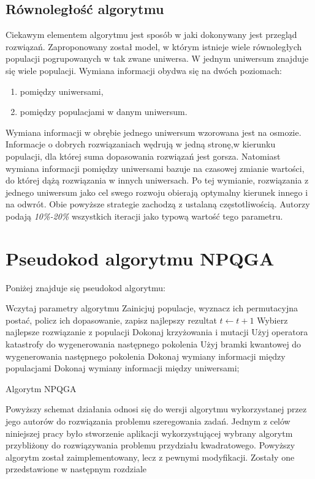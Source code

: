 \subsection{Równoległość algorytmu}
Ciekawym elementem algorytmu jest sposób w jaki dokonywany jest przegląd rozwiązań. Zaproponowany został model, w którym istnieje wiele równoległych populacji pogrupowanych w tak zwane uniwersa. W jednym uniwersum znajduje się wiele populacji. Wymiana informacji obydwa się na dwóch poziomach:
\begin{enumerate}
\item pomiędzy uniwersami,
\item pomiędzy populacjami w danym uniwersum.
\end{enumerate}

Wymiana informacji w obrębie jednego uniwersum wzorowana jest na osmozie. Informacje o dobrych rozwiązaniach wędrują w jedną stronę,w kierunku populacji, dla której suma dopasowania rozwiązań jest gorsza. Natomiast wymiana informacji pomiędzy uniwersami bazuje na czasowej zmianie wartości, do której dążą rozwiązania w innych uniwersach. Po tej wymianie, rozwiązania z jednego uniwersum jako cel swego rozwoju obierają optymalny kierunek innego i na odwrót.
Obie powyższe strategie zachodzą z ustalaną częstotliwością. Autorzy podają \textit{10\%-20\%} wszystkich iteracji jako typową wartość tego parametru. 

\section{Pseudokod algorytmu NPQGA}
Poniżej znajduje się pseudokod algorytmu:
\newpage
\begin{algorithm}[H]
	Wczytaj parametry algorytmu\;
	Zainicjuj populacje, wyznacz ich permutacyjna postać, policz ich dopasowanie, zapisz najlepszy rezultat
 	{
 		$t\leftarrow t+1$\;
  		{
  			Wybierz najlepsze rozwiązanie z populacji\;
  			Dokonaj krzyżowania i mutacji\;
  			{
  				Użyj operatora katastrofy do wygenerowania następnego pokolenia\;
  			}
  			\Else
  			{
  				Użyj bramki kwantowej do wygenerowania następnego pokolenia\;
  			}
  		}
  		{
  			Dokonaj wymiany informacji między populacjami\;
  		}
  		{
  			Dokonaj wymiany informacji między uniwersami;
  		}
 	}
 	\caption{Algorytm NPQGA}
\end{algorithm}

Powyższy schemat działania odnosi się do wersji algorytmu wykorzystanej przez jego autorów do rozwiązania problemu szeregowania zadań. Jednym z celów niniejszej pracy było stworzenie aplikacji wykorzystującej wybrany algorytm przybliżony do rozwiązywania problemu przydziału kwadratowego. Powyższy algorytm został zaimplementowany, lecz z pewnymi modyfikacji. Zostały one przedstawione w następnym rozdziale